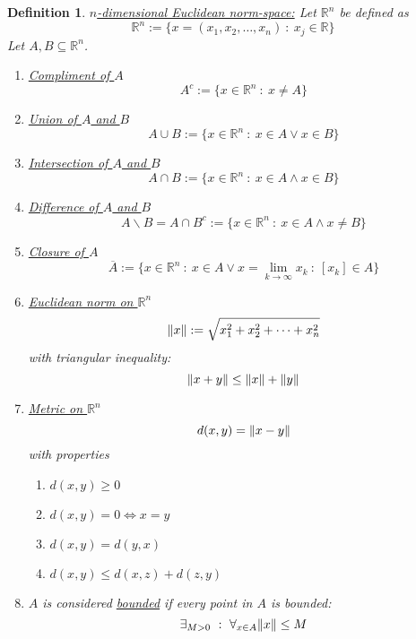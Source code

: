 \documentclass[]{article}
\newcommand{\R}{\mathbb{R}}
\newcommand{\st}{\ : \ }
\newtheorem{definition}{Definition}
\begin{document}
\begin{definition}
    \underline{\emph{$n$-dimensional Euclidean norm-space:}}
    Let $\R^n$ be defined as \[
        \R^n := \{
            x = (x_1, x_2, \dots, x_n) 
            \st x_j \in \R
        \}
    \] Let $A, B \subseteq \R^n$.
    \begin{enumerate}
        \item \emph{\underline{Compliment of $A$}} \[
            A^c := \{
                x \in \R^n \st x \neq A
            \}
        \] \item \emph{\underline{Union of $A$ and $B$}} \[
            A \cup B := \{
                x \in \R^n \st x \in A \lor x \in B
            \}
        \] \item \emph{\underline{Intersection of $A$ and $B$}} \[
            A \cap B := \{
                x \in \R^n \st x \in A \land x \in B
            \}
        \] \item \emph{\underline{Difference of $A$ and $B$}}\[
            A \backslash B = A \cap B^c := \{
                x \in \R^n \st x \in A \land x \neq B
            \}
        \] \item \emph{\underline{Closure of $A$}}\[
            \overline{A} := \{
                x \in \R^n \st x \in A \lor x = \lim_{k\to\infty} x_k \st [x_k] \in A
            \}
        \] \item \emph{\underline{Euclidean norm on $\R^n$}} \[
            \norm{x} := \sqrt{x_1^2 + x_2^2 + \cdots + x_n^2}
        \] with triangular inequality: \[
            \norm{x+y} \leq \norm{x} + \norm{y}
        \] \item \emph{\underline{Metric on $\R^n$}} \[
            d(x,y) = \norm{x - y}
        \] with properties \begin{enumerate}
            \item $d(x,y) \geq 0$
            \item $d(x,y) = 0 \iff x = y$
            \item $d(x,y) = d(y,x)$
            \item $d(x,y) \leq d(x,z) + d(z,y)$
        \end{enumerate}
        \item $A$ is considered \emph{\underline{bounded}} if every point in $A$ is bounded: \[
            \exists_{M > 0} \st \forall_{x\in A} \norm{x} \leq M
        \]
    \end{enumerate}
\end{definition}
\end{document}
